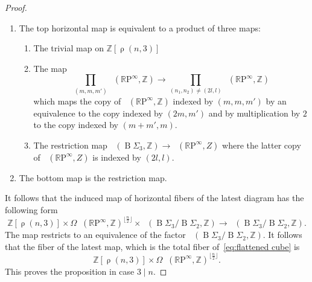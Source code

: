 \documentclass[10pt,a4paper]{amsart}
\DeclareMathOperator{\Part}{\rho}
\newcommand{\RP}{\mathbb{R}\mathrm{P}}
\newcommand{\Z}{\mathbb{Z}}
\newcommand{\classifying}{\operatorname{B}}
\DeclareMathOperator{\map}{Map}
\DeclareMathOperator{\pointedmaps}{\map_*}
\begin{document}
\begin{proof}
\begin{enumerate}
    \item The top horizontal map is equivalent to a product of three maps:
    \begin{enumerate}
        \item The trivial map on $\Z[\Part(n,3)]$
        \item The map 
        \[
        \prod_{(m, m, m')}\pointedmaps(\RP^\infty, \Z) \to \prod_{(n_1, n_2)\ne(2l, l)} \pointedmaps(\RP^\infty, \Z)
        \]
        which maps the copy of $\pointedmaps(\RP^\infty, \Z)$ indexed by $(m,m,m')$ by an equivalence to the copy indexed by $(2m, m')$ and by multiplication by $2$ to the copy indexed by $(m+m', m)$.
        \item The restriction map $\pointedmaps(\classifying\Sigma_3, \Z)\to \pointedmaps(\RP^\infty, Z)$ where the latter copy of $\pointedmaps(\RP^\infty, Z)$ is indexed by $(2l, l)$.
    \end{enumerate}
    \item The bottom map is the restriction map.
\end{enumerate}  
It follows that the induced map of horizontal fibers of the latest diagram has the following form
\[
\Z[\Part(n, 3)]\times \Omega\pointedmaps (\RP^\infty,\Z)^{\lfloor\frac{n}{2}\rfloor}\times \pointedmaps(\classifying\Sigma_3/\classifying\Sigma_2, \Z)\to \pointedmaps(\classifying\Sigma_3/\classifying\Sigma_2, \Z).
\]
The map restricts to an equivalence of the factor $\pointedmaps(\classifying\Sigma_3/\classifying\Sigma_2, \Z)$. It follows that the fiber of the latest map, which is the total fiber of~\eqref{eq:flattened cube} is 
\[
\Z[\Part(n, 3)]\times \Omega\pointedmaps (\RP^\infty,\Z)^{\lfloor\frac{n}{2}\rfloor}.
\]
This proves the proposition in case $3\mid n$.
\end{proof}
\end{document}
